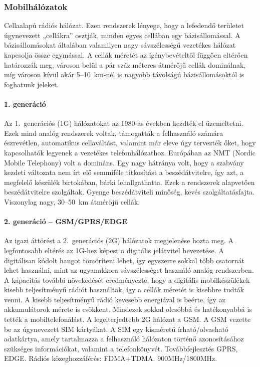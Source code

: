 \subsubsection{Mobilhálózatok}
Cellaalapú rádiós hálózat. Ezen rendszerek lényege, hogy a lefedendő területet úgynevezett „cellákra” osztják, minden egyes cellában egy bázisállomással. A bázisállomásokat általában valamilyen nagy sávszélességű vezetékes hálózat kapcsolja össze egymással. A cellák méretét az igénybevételtől függően eltérően határozzák meg, városon belül a pár száz méteres átmérőjű cellák dominálnak, míg városon kívül akár 5--10~km-nél is nagyobb távolságú bázisállomásoktól is foghatunk jeleket.

\paragraph{1. generáció}
Az 1.~generációs (1G) hálózatokat az 1980-as években kezdték el üzemeltetni. Ezek mind analóg rendszerek voltak, támogatták a felhasználó számára észrevétlen, automatikus cellaváltást, valamint már eleve úgy tervezték őket, hogy kapcsolhatók legyenek a vezetékes telefonhálózathoz. Európában az NMT (Nordic Mobile Telephony) volt a domináns. Egy nagy hátránya volt, hogy a szabvány kezdeti változata nem írt elő semmiféle titkosítást a beszédátvitelre, így azt, a megfelelő készülék birtokában, bárki lehallgathatta. Ezek a rendszerek alapvetően beszédátvitelre szolgáltak. Gyenge beszédátviteli minőség, kevés szolgáltatásfajta. Viszonylag nagy, 30--50~km átmérőjű cellák.

\paragraph{2. generáció -- GSM/GPRS/EDGE}
Az igazi áttörést a 2.~generációs (2G) hálózatok megjelenése hozta meg. A legfontosabb eltérés az 1G-hez képest a digitális jelátvitel bevezetése. A digitálisan kódolt hangot tömöríteni lehet, így egyszerre sokkal több csatornát lehet használni, mint az ugyanakkora sávszélességet használó analóg rendszerben. A kapacitás további növekedését eredményezte, hogy a digitális mobilkészülékek kisebb teljesítményű rádiót használtak, így a cellák méretét is kisebbre tudták venni. A kisebb teljesítményű rádió kevesebb energiával is beérte, így az akkumulátorok mérete is csökkent. Mindezek sokkal olcsóbbá és hatékonyabbá is tették a mobiltelefonálást. A legelterjedtebb 2G hálózat a GSM. A GSM vezette be az úgynevezett SIM kártyákat. A SIM egy kisméretű írható/olvasható adatkártya, amely tartalmazza a felhasználó hálózaton történő azonosításához szükséges információkat, valamint a telefonkönyvét. Továbbfejlesztés GPRS, EDGE. Rádiós közeghozzáférés: FDMA+TDMA. 900MHz/1800MHz.

